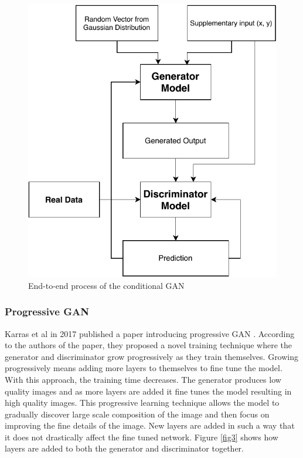 \documentclass[conference]{IEEEtran}
\begin{document}
\begin{figure}[!h]
    \centerline{\includegraphics[scale=0.6]{figures/CGAN.pdf}}
    \caption{End-to-end process of the conditional GAN}
    \label{fig2}
\end{figure}

\subsubsection{Progressive GAN}
Karras et al in 2017 published a paper introducing progressive GAN \cite{b12}. According to the authors of the paper, they proposed a novel training technique where the generator and discriminator grow progressively as they train themselves. Growing progressively means adding more layers to themselves to fine tune the model. With this approach, the training time decreases. The generator produces low quality images and as more layers are added it fine tunes the model resulting in high quality images. This progressive learning technique allows the model to gradually discover large scale composition of the image and then focus on improving the fine details of the image. New layers are added in such a way that it does not drastically affect the fine tuned network. Figure \ref{fig3} shows how layers are added to both the generator and discriminator together.
\end{document}
